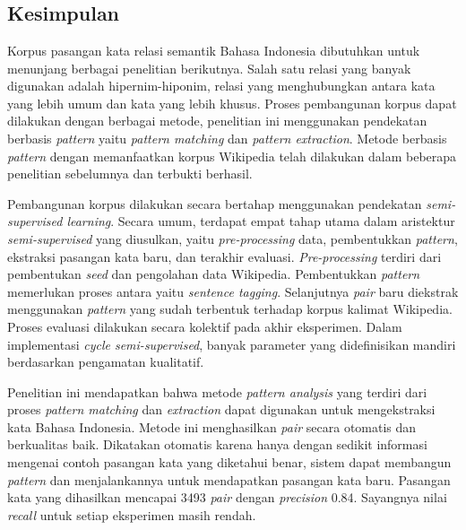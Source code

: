 \chapter{\babEnam}

\section{Kesimpulan}
Korpus pasangan kata relasi semantik Bahasa Indonesia dibutuhkan untuk menunjang berbagai penelitian berikutnya. Salah satu relasi yang banyak digunakan adalah hipernim-hiponim, relasi yang menghubungkan antara kata yang lebih umum dan kata yang lebih khusus. Proses pembangunan korpus dapat dilakukan dengan berbagai metode, penelitian ini menggunakan pendekatan berbasis \textit{pattern} yaitu \textit{pattern matching} dan \textit{pattern extraction}. Metode berbasis \textit{pattern} dengan memanfaatkan korpus Wikipedia telah dilakukan dalam beberapa penelitian sebelumnya dan terbukti berhasil. 

Pembangunan korpus dilakukan secara bertahap menggunakan pendekatan \textit{semi-supervised learning}. Secara umum, terdapat empat tahap utama dalam aristektur \textit{semi-supervised} yang diusulkan, yaitu \textit{pre-processing} data, pembentukkan \textit{pattern}, ekstraksi pasangan kata baru, dan terakhir evaluasi. \textit{Pre-processing} terdiri dari pembentukan \textit{seed} dan pengolahan data Wikipedia. Pembentukkan \textit{pattern} memerlukan proses antara yaitu \textit{sentence tagging}. Selanjutnya \textit{pair} baru diekstrak menggunakan \textit{pattern} yang sudah terbentuk terhadap korpus kalimat Wikipedia. Proses evaluasi dilakukan secara kolektif pada akhir eksperimen. Dalam implementasi \textit{cycle semi-supervised}, banyak parameter yang didefinisikan mandiri berdasarkan pengamatan kualitatif.

Penelitian ini mendapatkan bahwa metode \textit{pattern analysis} yang terdiri dari proses \textit{pattern matching} dan \textit{extraction} dapat digunakan untuk mengekstraksi kata Bahasa Indonesia. Metode ini menghasilkan \textit{pair} secara otomatis dan berkualitas baik. Dikatakan otomatis karena hanya dengan sedikit informasi mengenai contoh pasangan kata yang diketahui benar, sistem dapat membangun \textit{pattern} dan menjalankannya untuk mendapatkan pasangan kata baru. Pasangan kata yang dihasilkan mencapai 3493 \textit{pair} dengan \textit{precision} 0.84. Sayangnya nilai \textit{recall} untuk setiap eksperimen masih rendah.

